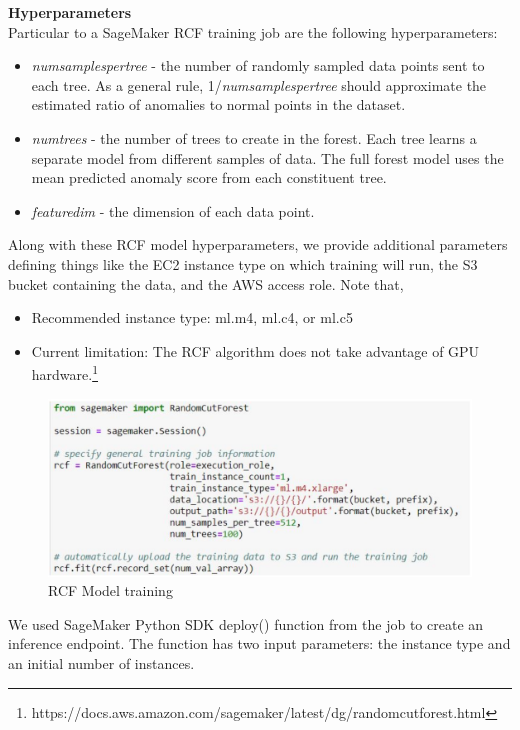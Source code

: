 \textbf{Hyperparameters}\\
Particular to a SageMaker RCF training job are the following hyperparameters:
\begin{itemize}
    \item \textit{num\textunderscore samples\textunderscore per\textunderscore tree} - the number of randomly sampled data points sent to each tree. As a general rule, 1/\textit{num\textunderscore samples\textunderscore per\textunderscore tree} should approximate the estimated ratio of anomalies to normal points in the dataset.
    \item \textit{num\textunderscore trees} - the number of trees to create in the forest. Each tree learns a separate model from different samples of data. The full forest model uses the mean predicted anomaly score from each constituent tree.
    \item \textit{feature\textunderscore dim} - the dimension of each data point.
\end{itemize}
Along with these RCF model hyperparameters, we provide additional parameters defining things like the EC2 instance type on which training will run, the S3 bucket containing the data, and the AWS access role. Note that,
\begin{itemize}
    \item Recommended instance type: ml.m4, ml.c4, or ml.c5
    \item Current limitation: The RCF algorithm does not take advantage of GPU hardware.\footnote{ https://docs.aws.amazon.com/sagemaker/latest/dg/randomcutforest.html}\\
\end{itemize}
\begin{figure}[h]
    \centering
    \includegraphics[width=1\textwidth]{images/rcf-model-training.png}
    \caption{RCF Model training}
    \label{fig:rcf_model_training}
\end{figure}
We used SageMaker Python SDK deploy() function from the job to create an inference endpoint. The function has two input parameters:  the instance type and an initial number of instances. 

